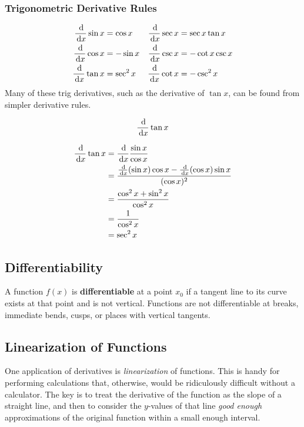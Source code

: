 \subsubsection{Trigonometric Derivative Rules}
\begin{align}
  \frac{\,\mathrm{d}}{\,\mathrm{d} x} \sin x &= \cos x & \frac{\,\mathrm{d}}{\,\mathrm{d} x} \sec x &= \sec x \tan x \\
  \frac{\,\mathrm{d}}{\,\mathrm{d} x} \cos x &= -\sin x & \frac{\,\mathrm{d}}{\,\mathrm{d} x} \csc x &= -\cot x \csc x \\
  \frac{\,\mathrm{d}}{\,\mathrm{d} x} \tan x &= \sec^2 x & \frac{\,\mathrm{d}}{\,\mathrm{d} x} \cot x &= -\csc^2 x
  \label{trigderiv}
\end{align}
Many of these trig derivatives, such as the derivative of $\tan x$, can be found from simpler derivative rules.
\begin{ex}
  \[\frac{\,\mathrm{d}}{\,\mathrm{d} x} \tan x\]
  \begin{sol}
    \begin{align*}
      \frac{\,\mathrm{d}}{\,\mathrm{d} x} \tan x &= \frac{\,\mathrm{d}}{\,\mathrm{d} x} \frac{\sin x}{\cos x} \\
      &= \frac{\frac{\,\mathrm{d}}{\,\mathrm{d} x} (\sin x) \cos x - \frac{\,\mathrm{d}}{\,\mathrm{d} x} (\cos x) \sin x}{(\cos x)^2}\\
      &=\frac{\cos^2 x+\sin^2 x}{\cos^2 x}\\
      &=\frac{1}{\cos^2 x}\\
      &=\sec^2 x
    \end{align*}
  \end{sol}
\end{ex}
\subsection{Differentiability}
A function $f(x)$ is \textbf{differentiable} at a point $x_0$ if a tangent line to its curve exists at that point and is not vertical.
Functions are not differentiable at breaks, immediate bends, cusps, or places with vertical tangents.

\subsection{Linearization of Functions}

One application of derivatives is \emph{linearization} of functions.
This is handy for performing calculations that, otherwise, would be ridiculously difficult without a calculator.
The key is to treat the derivative of the function as the slope of a straight line,
and then to consider the $y$-values of that line \emph{good enough} approximations of the original function within a small enough interval.

